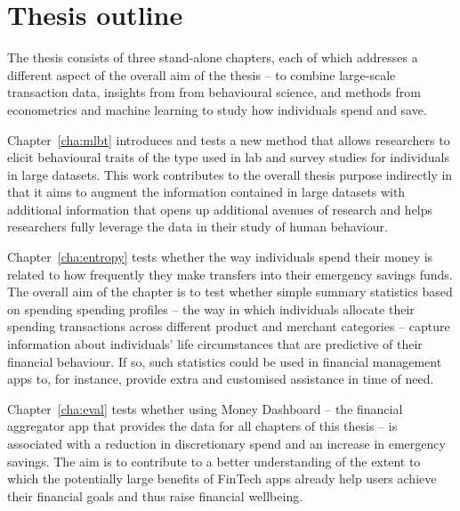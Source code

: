 
\section{Thesis outline}%

The thesis consists of three stand-alone chapters, each of which addresses a
different aspect of the overall aim of the thesis -- to combine large-scale
transaction data, insights from from behavioural science, and methods from
econometrics and machine learning to study how individuals spend and save. 

Chapter~\ref{cha:mlbt} introduces and tests a new method that allows
researchers to elicit behavioural traits of the type used in lab and survey
studies for individuals in large datasets. This work contributes to the overall
thesis purpose indirectly in that it aims to augment the information contained
in large datasets with additional information that opens up additional avenues
of research and helps researchers fully leverage the data in their study of
human behaviour.

Chapter~\ref{cha:entropy} tests whether the way individuals spend their money
is related to how frequently they make transfers into their emergency savings
funds. The overall aim of the chapter is to test whether simple summary
statistics based on spending spending profiles -- the way in which individuals
allocate their spending transactions across different product and merchant
categories -- capture information about individuals' life circumstances that
are predictive of their financial behaviour. If so, such statistics could be
used in financial management apps to, for instance, provide extra and
customised assistance in time of need.

Chapter~\ref{cha:eval} tests whether using Money Dashboard -- the financial
aggregator app that provides the data for all chapters of this thesis -- is
associated with a reduction in discretionary spend and an increase in emergency
savings. The aim is to contribute to a better understanding of the extent to
which the potentially large benefits of FinTech apps already help users achieve
their financial goals and thus raise financial wellbeing.
